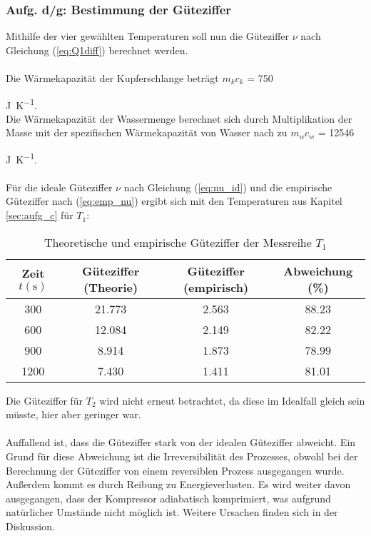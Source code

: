 \newpage

\subsubsection{Aufg. d/g: Bestimmung der Güteziffer}

Mithilfe der vier gewählten Temperaturen soll nun die Güteziffer $\nu$ nach Gleichung 
(\ref{eq:Q1diff}) berechnet werden. \\
\\
Die Wärmekapazität der Kupferschlange beträgt $m_{k} c_{k}$ = 750 {\unit[per-mode=fraction]{\joule\per\kelvin}. \\
Die Wärmekapazität der Wassermenge berechnet sich durch Multiplikation der Masse mit der spezifischen
Wärmekapazität von Wasser nach \cite[278]{demtroeder1} zu $m_{w} c_{w}$ = 12546 {\unit[per-mode=fraction]{\joule\per\kelvin}. \\
\\
Für die ideale Güteziffer $\nu$ nach Gleichung (\ref{eq:nu_id}) und die empirische Güteziffer nach (\ref{eq:emp_nu})
ergibt sich mit den Temperaturen aus Kapitel \ref{sec:aufg_c} für $T_{1}$:

\begin{table}
  \centering
  \caption{Theoretische und empirische Güteziffer der Messreihe $T_{1}$}
  \label{tab:güteziffern_t1}
  \begin{tabular}{c c c c}
    \toprule
    {Zeit $t (\unit{\second})$} &
    Güteziffer (Theorie) &
    Güteziffer (empirisch) &
    Abweichung (\%) \\
    \midrule
         300 &                21.773 &                   2.563 &           88.23 \\
         600 &                12.084 &                   2.149 &           82.22 \\
         900 &                 8.914 &                   1.873 &           78.99 \\
        1200 &                 7.430 &                   1.411 &           81.01 \\
    \bottomrule
    \end{tabular}
\end{table}

Die Güteziffer für $T_{2}$ wird nicht erneut betrachtet, da diese im Idealfall gleich sein
müsste, hier aber geringer war.\\
\\
Auffallend ist, dass die Güteziffer stark von der idealen Güteziffer abweicht. Ein Grund für diese
Abweichung ist die Irreversibilität des Prozesses, obwohl bei der Berechnung der Güteziffer von
einem reversiblen Prozess ausgegangen wurde. Außerdem kommt es durch Reibung zu Energieverlusten.
Es wird weiter davon ausgegangen, dass der Kompressor adiabatisch komprimiert, was aufgrund natürlicher
Umstände nicht möglich ist. Weitere Ursachen finden sich in der Diskussion.

}}
